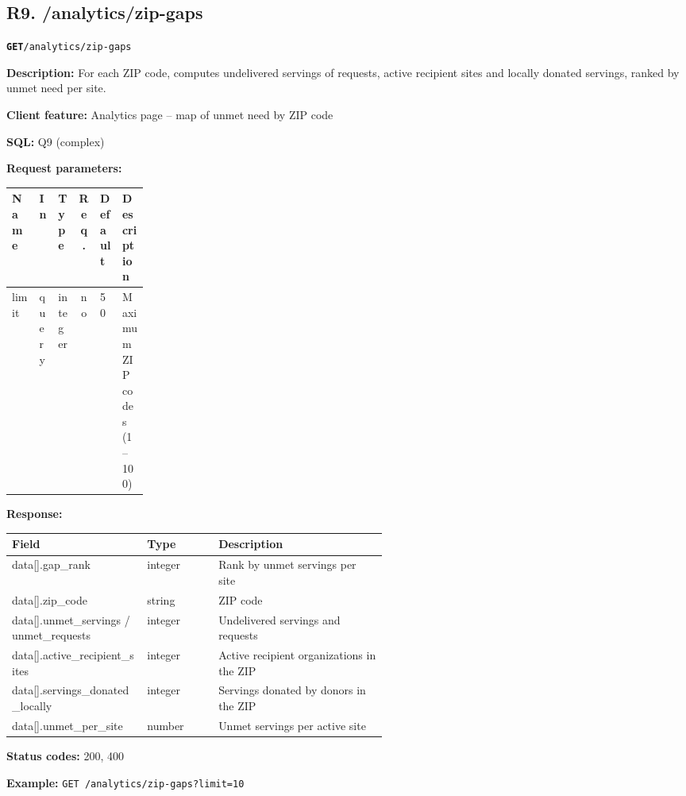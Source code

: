 \documentclass[11pt,letterpaper]{article}
\newcommand{\brk}{\penalty0\relax}
\newcommand{\routebar}[2]{%
  \par\noindent\colorbox{boxGray}{\parbox{\dimexpr\linewidth-2\fboxsep}{%
  \strut\textbf{\texttt{#1}}\quad\texttt{#2}\strut}}\par\smallskip}
\newcommand{\kv}[2]{\textbf{#1:} #2\par}
\begin{document}
\subsection*{R9. /analytics/zip-gaps}
\routebar{GET}{/analytics/zip-gaps}
\kv{Description}{For each ZIP code, computes undelivered servings of requests, active recipient sites and locally donated servings, ranked by unmet need per site.}
\kv{Client feature}{Analytics page -- map of unmet need by ZIP code}
\kv{SQL}{Q9 (complex)}
\kv{Request parameters}{}
\begin{xltabular}{\linewidth}{>{\ttfamily\raggedright\arraybackslash}p{0.2\linewidth} l l c l >{\raggedright\arraybackslash}X}
\toprule
\textrm{\textbf{Name}} & \textbf{In} & \textbf{Type} & \textbf{Req.} & \textbf{Default} & \textbf{Description} \\
\midrule
limit & query & integer & no & 50 & Maximum ZIP codes (1--100) \\
\bottomrule
\end{xltabular}
\kv{Response}{}
\begin{xltabular}{\linewidth}{>{\ttfamily\raggedright\arraybackslash}p{0.36\linewidth} >{\raggedright\arraybackslash}p{0.19\linewidth} >{\raggedright\arraybackslash}X}
\toprule
\textrm{\textbf{Field}} & \textbf{Type} & \textbf{Description} \\
\midrule
data[].\brk{}gap\_rank & integer & Rank by unmet servings per site \\
data[].\brk{}zip\_code & string & ZIP code \\
data[].\brk{}unmet\_servings /\brk{} unmet\_requests & integer & Undelivered servings and requests \\
data[].\brk{}active\_recipient\_sites & integer & Active recipient organizations in the ZIP \\
data[].\brk{}servings\_donated\_locally & integer & Servings donated by donors in the ZIP \\
data[].\brk{}unmet\_per\_site & number & Unmet servings per active site \\
\bottomrule
\end{xltabular}
\kv{Status codes}{200, 400}
{\raggedright\textbf{Example:} {\small \texttt{GET /\brk{}analytics/\brk{}zip-gaps?\brk{}limit=\brk{}10}}\par}
\end{document}

